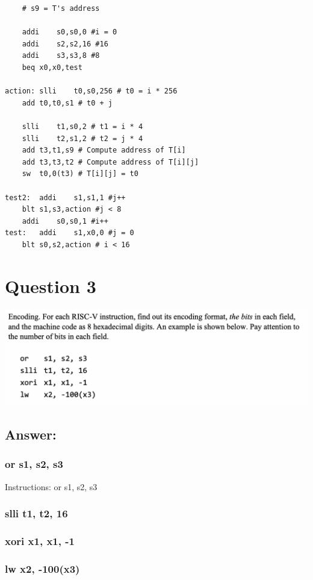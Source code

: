 \documentclass{article}
\begin{document}
\begin{lstlisting}
	# s9 = T's address

	addi	s0,s0,0 #i = 0
	addi	s2,s2,16 #16
	addi	s3,s3,8 #8
	beq	x0,x0,test

action: slli	t0,s0,256 # t0 = i * 256
	add	t0,t0,s1 # t0 + j
	
	slli	t1,s0,2 # t1 = i * 4
	slli	t2,s1,2 # t2 = j * 4
	add	t3,t1,s9 # Compute address of T[i]
	add	t3,t3,t2 # Compute address of T[i][j]
	sw	t0,0(t3) # T[i][j] = t0
	
test2:	addi	s1,s1,1 #j++
	blt	s1,s3,action #j < 8
	addi	s0,s0,1 #i++
test: 	addi	s1,x0,0 #j = 0
	blt	s0,s2,action # i < 16
\end{lstlisting}

\section*{Question 3}
\begin{center}
    \includegraphics[scale=.559]{./images/Q3Problem.png}
\end{center}

\subsection*{Answer:}
\subsubsection*{or  s1, s2, s3}
Instructions: or  s1, s2, s3

\subsubsection*{slli  t1, t2, 16}


\subsubsection*{xori  x1, x1, -1}


\subsubsection*{lw  x2, -100(x3)}
\end{document}

